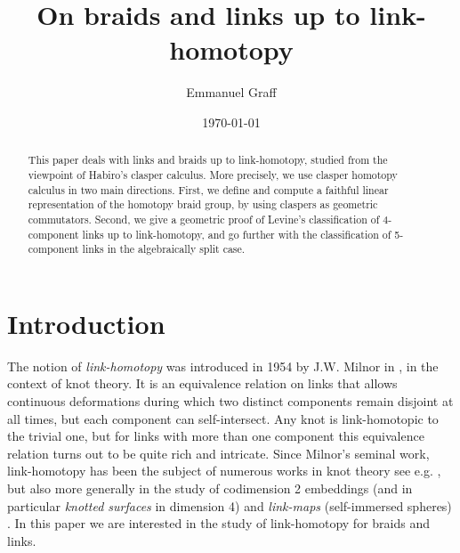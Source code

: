 \documentclass[11pt, a4paper, twoside,reqno]{amsart}
\begin{document}
\normalem
\title{On braids and links up to link-homotopy}
	
	\author[Emmanuel Graff]{Emmanuel Graff}
	\address{Normandie Univ, UNICAEN, CNRS, LMNO, 14000 Caen, France}
	 	
	\date{\today}
	
	
	
	
\begin{abstract}
This paper deals with links and braids up to link-homotopy, studied from the viewpoint of Habiro's clasper calculus. More precisely, we use clasper homotopy calculus in two main directions. First, we define and compute a faithful linear representation of the homotopy braid group, by using claspers as geometric commutators. Second, we give a geometric proof of Levine's classification of 4-component links up to link-homotopy, and go further with the classification of 5-component links in the algebraically split case.
\end{abstract}
    \maketitle

\section{Introduction}

The notion of \emph{link-homotopy} was introduced in 1954 by J.W. Milnor in \cite{MilnorLinkgrp}, in the context of knot theory. It is an equivalence relation on links that allows continuous deformations during which two distinct components remain disjoint at all times, but each component can self-intersect. Any knot is link-homotopic to the trivial one, but for links with more than one component this equivalence relation turns out to be quite rich and intricate. Since Milnor’s seminal work, link-homotopy has been the subject of numerous works in knot theory see e.g. \cite{GoldsmithHomotopybraids,Levine4comp,OrrHomoInvLinks,HabeggerLinHomotopy}, but also more generally in the study of codimension 2 embeddings (and in particular \emph{knotted surfaces} in dimension 4) \cite{MasseyRolfsenHomoClassHigherdimLinks,BartelsTeichner2DimLinksNullHomo,AudouxJBWagnerCodim2EmbeddingHomo} and  \emph{link-maps} (self-immersed spheres) \cite{FennRolfsenSphereHomo4space,KirkLinkmaps4sphere,KoschorkeLinkmapsclass,SchneidermanTeichnerGroupDisjoint2sphere4space}. In this paper we are interested in the study of link-homotopy for braids and links.
\end{document}
